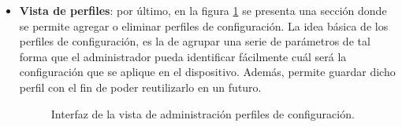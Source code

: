\begin{itemize}
    \item \textbf{Vista de perfiles}: por último, en la figura \ref{fig:captura_web_topo} se presenta una sección donde se permite agregar o eliminar perfiles de configuración. La idea básica de los perfiles de configuración, es la de agrupar una serie de parámetros de tal forma que el administrador pueda identificar fácilmente cuál será la configuración que se aplique en el dispositivo. Además, permite guardar dicho perfil con el fin de poder reutilizarlo en un futuro. 

    \begin{figure}[H]
        \centering
        \caption{Interfaz de la vista de administración perfiles de configuración.}
        \label{fig:captura_web_topo}
      \end{figure}
    
\end{itemize}



